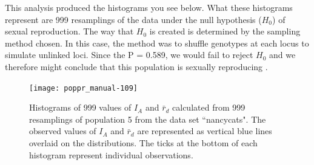 \documentclass[letterpaper]{article}
\begin{document}
This analysis produced the histograms you see below. What these histograms represent are 999 resamplings of the data under the null hypothesis ($H_0$) of sexual reproduction. The way that $H_0$ is created is determined by the sampling method chosen. In this case, the method was to shuffle genotypes at each locus to simulate unlinked loci. Since the P = 0.589, we would fail to reject $H_0$ and we therefore might conclude that this population is sexually reproducing \cite{Brown:1980} \cite{Smith:1993} \cite{Agapow:2001}.
\begin{figure}[h!]
  \centering
  \caption{\footnotesize Histograms of 999 values of $I_A$ and $\bar{r}_d$ calculated from 999 resamplings of population 5 from the data set ``nancycats". The observed values of $I_A$ and $\bar r_d$ are represented as vertical blue lines overlaid on the distributions. The ticks at the bottom of each histogram represent individual observations.}
  \label{ia_demo_fig}
\texttt{[image: poppr\_manual-109]}
\end{figure}
\end{document}
